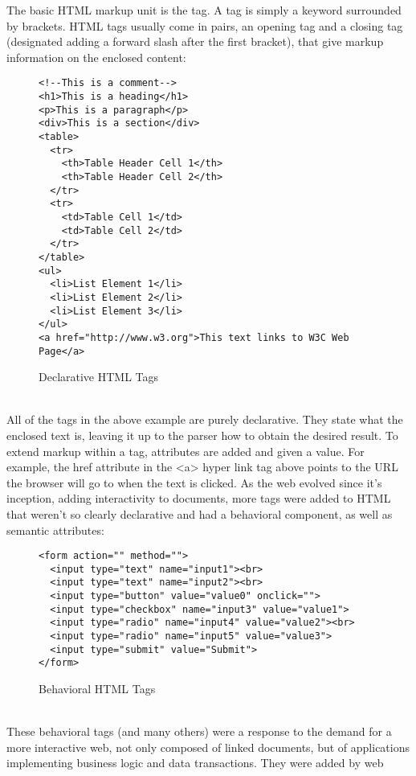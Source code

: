 The basic HTML markup unit is the tag. A tag is simply a keyword surrounded by brackets. HTML tags usually come in
pairs, an opening tag and a closing tag (designated adding a forward slash after the first bracket), that give markup
information on the enclosed content:
\begin{figure}[h]
\centering
{}
\begin{verbatim}
<!--This is a comment-->
<h1>This is a heading</h1>
<p>This is a paragraph</p>
<div>This is a section</div>
<table>
  <tr>
    <th>Table Header Cell 1</th>
    <th>Table Header Cell 2</th> 
  </tr>
  <tr>
    <td>Table Cell 1</td>
    <td>Table Cell 2</td> 
  </tr>
</table>
<ul>
  <li>List Element 1</li>
  <li>List Element 2</li>
  <li>List Element 3</li>
</ul>
<a href="http://www.w3.org">This text links to W3C Web Page</a>
\end{verbatim}
\caption{Declarative HTML Tags}
\end{figure}\\
All of the tags in the above example are purely declarative. They state what the enclosed text is, leaving it up to
the parser how to obtain the desired result. To extend markup within a tag, attributes are added and given a value. For 
example, the href attribute in the <a> hyper link tag above points to the URL the browser will go to when the text is 
clicked. As the web evolved since it's inception, adding interactivity to documents, more tags were added to HTML that 
weren't so clearly declarative and had a behavioral component, as well as semantic attributes:\\
\begin{figure}[h]
\centering
{}
\begin{verbatim}
<form action="" method="">
  <input type="text" name="input1"><br>
  <input type="text" name="input2"><br>
  <input type="button" value="value0" onclick="">
  <input type="checkbox" name="input3" value="value1">
  <input type="radio" name="input4" value="value2"><br>
  <input type="radio" name="input5" value="value3">
  <input type="submit" value="Submit">
</form>
\end{verbatim}
\caption{Behavioral HTML Tags}
\end{figure}\\
These behavioral tags (and many others) were a response to the demand for a more interactive web, not only composed of
linked documents, but of applications implementing business logic and data transactions. They were added by web
